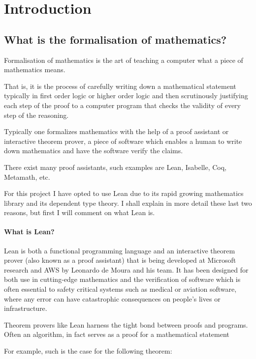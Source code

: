 \chapter{Introduction}\label{Ch2_Introduction}

\section{What is the formalisation of mathematics?}

Formalisation of mathematics is the art of teaching a computer what a piece of mathematics means.

That is, it is the process of carefully writing down a mathematical statement typically in first order logic or higher order logic and then scrutinously justifying each step of the proof to a computer program that checks the validity of every step of the reasoning. 

Typically one formalizes mathematics with the help of a proof assistant or interactive theorem prover, a piece of software which enables a human to write down mathematics and have the software verify the claims.

There exist many proof assistants, such examples are Lean, Isabelle, Coq, Metamath, etc.

For this project I have opted to use Lean due to its rapid growing mathematics library and its dependent type theory. I shall explain in more detail these last two reasons, but first I will comment on what Lean is.

\subsubsection{What is Lean?}

Lean is both a functional programming language and an interactive theorem prover (also known as a proof assistant) that is being developed at Microsoft research and AWS by Leonardo de Moura and his team.
It has been designed for both use in cutting-edge mathematics and the verification of software which is often essential to safety critical systems such as medical or aviation software, where any error can have
catastrophic consequences on people's lives or infrastructure.

Theorem provers like Lean harness the tight bond between proofs and programs. Often an algorithm, in fact serves as a proof for a mathematical statement

For example, such is the case for the following theorem:

